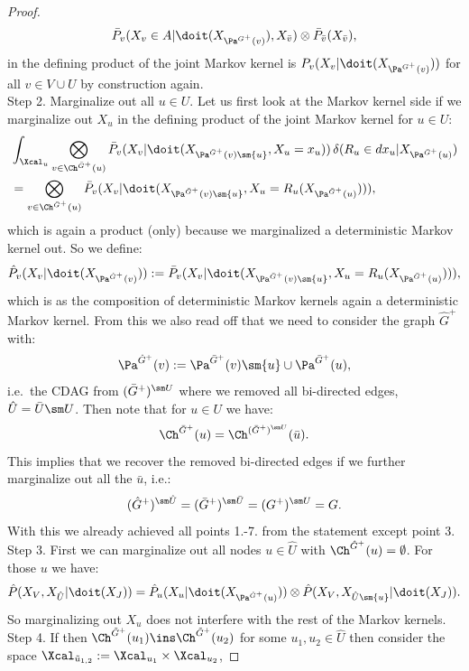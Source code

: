 \begin{Thm}
\begin{proof}
    \[   \bar P_v(X_v \in A|\doit(X_{\Pa^{G^+}(v)}), X_{\bar v})  \otimes \bar P_{\bar v}(X_{\bar v}),\]
    in the defining product of the joint Markov kernel
    is $P_v(X_v|\doit(X_{\Pa^{G^+}(v)}))$ for all $ v \in V \cup U$ by construction again.\\ 
    Step 2. Marginalize out all $u \in U$.    
    Let us first look at the Markov kernel side if we marginalize out $X_u$ 
    in the defining product of the joint Markov kernel for $u \in U$:
    \begin{align*}
     &   \int_{\Xcal_u} \bigotimes_{v \in \Ch^{\bar G^+}(u)} \bar P_v(X_v|\doit(X_{\Pa^{\bar G^+}(v)\sm\{u\}},
        X_u=x_u)) \, \delta(R_u \in dx_u|X_{\Pa^{\bar G^+}(u)}) \\
   & = \bigotimes_{v \in \Ch^{\bar G^+}(u)} \bar P_v(X_v|\doit(X_{\Pa^{\bar G^+}(v)\sm\{u\}},
   X_u=R_u(X_{\Pa^{\bar G^+}(u)}))), 
    \end{align*}
    which is again a product (only) because we marginalized a deterministic Markov kernel out.
    So we define:
    \[ \hat P_v(X_v|\doit(X_{\Pa^{\hat G^+}(v)})) := \bar P_v(X_v|\doit(X_{\Pa^{\bar G^+}(v)\sm\{u\}},
   X_u=R_u(X_{\Pa^{\bar G^+}(u)}))), \]
   which is as the composition of deterministic Markov kernels again a deterministic Markov kernel.
    From this we also read off that we need to consider the graph $\hat G^+$ with:
    \[ \Pa^{\hat G^+}(v) := {\Pa^{\bar G^+}(v)\sm\{u\}} \cup {\Pa^{\bar G^+}(u)},\]
    i.e.\ the CDAG from $(\bar G^+)^{\sm U}$ 
    where we removed all bi-directed edges, $\hat U = \bar U \sm U$.
    Then note that for $u \in U$ we have:
    \[\Ch^{\bar G^+}(u) = \Ch^{(\bar G^+)^{\sm U}}(\bar u).\]
    This implies that we recover the removed bi-directed edges if we further marginalize out all the $\bar u$, i.e.:
    \[(\hat G^+)^{\sm \hat U} = (\bar G^+)^{\sm \bar U} = (G^+)^{\sm U} = G. \]
    With this we already achieved all points 1.-7. from the statement except point 3.\\
    Step 3. First we can marginalize out all nodes $u \in \hat U$ with $\Ch^{\hat G^+}(u) = \emptyset$. For those $u$ we have:
    \[\hat P(X_V,X_{\hat U}|\doit(X_J)) = \hat P_u( X_u|\doit(X_{\Pa^{\hat G^+}(u)}) ) \otimes 
    \hat P(X_V,X_{\hat U\sm \{u\}}|\doit(X_J)).\]
    So marginalizing out $X_u$ does not interfere with the rest of the Markov kernels.\\
    Step 4. If then $\Ch^{\tilde G^+}(u_1) \ins \Ch^{\tilde G^+}(u_2)$ for some $u_1,u_2 \in \hat U$ then 
    consider the space $\Xcal_{\tilde u_{1,2}} := \Xcal_{u_1} \times \Xcal_{u_2}$,  

\end{proof}
\end{Thm}
